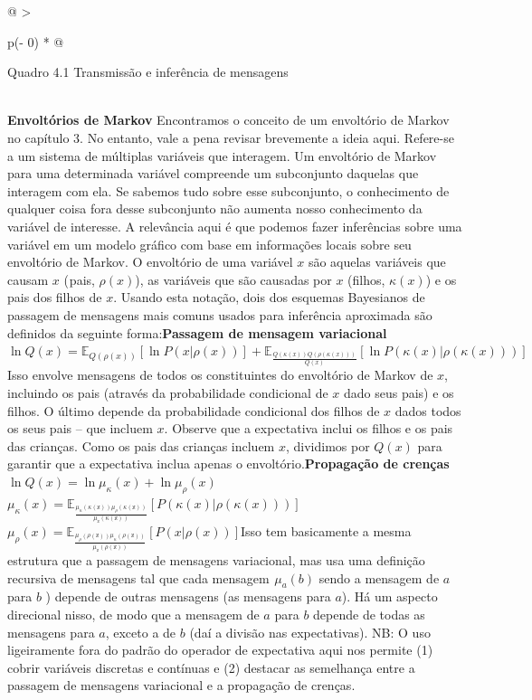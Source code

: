 \documentclass[
  12pt,
]{book}
\begin{document}
\begin{longtable}[]{@{}
  >{\raggedright\arraybackslash}p{(\columnwidth - 0\tabcolsep) * }@{}}
\toprule
\begin{minipage}[b]{\linewidth}\raggedright
Quadro 4.1 Transmissão e inferência de mensagens
\end{minipage} \\
\midrule
\endhead
\textbf{Envoltórios de Markov} Encontramos o conceito de um envoltório de Markov no capítulo 3. No entanto, vale a pena revisar brevemente a ideia aqui. Refere-se a um sistema de múltiplas variáveis que interagem. Um envoltório de Markov para uma determinada variável compreende um subconjunto daquelas que interagem com ela. Se sabemos tudo sobre esse subconjunto, o conhecimento de qualquer coisa fora desse subconjunto não aumenta nosso conhecimento da variável de interesse. A relevância aqui é que podemos fazer inferências sobre uma variável em um modelo gráfico com base em informações locais sobre seu envoltório de Markov. O envoltório de uma variável \(x\) são aquelas variáveis que causam \(x\) ( pais, \(ρ(x)\)), as variáveis que são causadas por \(x\) (filhos, \(κ (x)\)) e os pais dos filhos de \(x\). Usando esta notação, dois dos esquemas Bayesianos de passagem de mensagens mais comuns usados para inferência aproximada são definidos da seguinte forma:\textbf{Passagem de mensagem variacional}\( \ln Q(x)=\mathbb{E}_{Q(\rho(x))}[\ln P(x|\rho(x))]+\mathbb{E}_{\frac {Q(\kappa (x))Q(\rho(\kappa (x)))}{Q(x)}}[\ln P( \kappa (x) | \rho(\kappa (x)))]\)Isso envolve mensagens de todos os constituintes do envoltório de Markov de \(x\), incluindo os pais (através da probabilidade condicional de \(x\) dado seus pais) e os filhos. O último depende da probabilidade condicional dos filhos de \(x\) dados todos os seus pais -- que incluem \(x\). Observe que a expectativa inclui os filhos e os pais das crianças. Como os pais das crianças incluem \(x\), dividimos por \(Q(x)\) para garantir que a expectativa inclua apenas o envoltório.\textbf{Propagação de crenças}\(\ln Q(x) = \ln \mu_\kappa(x) + \ln \mu_\rho(x) \) \(\mu_\kappa(x)=\mathbb{E_{\frac{\mu_\kappa(\kappa(x))\mu_\rho(\kappa(x))}{\mu_x(\kappa(x))}}}[P( \kappa(x) | \rho(\kappa(x)) )]\)\(\mu_\rho(x)=\mathbb{E_{\frac{\mu_\rho(\rho(x))\mu_\kappa(\rho(x))}{\mu_x(\rho(x))}}}[P( x | \rho(x) )]\)Isso tem basicamente a mesma estrutura que a passagem de mensagens variacional, mas usa uma definição recursiva de mensagens tal que cada mensagem  \(μ_a(b)\) sendo a mensagem de \(a\) para \(b\) ) depende de outras mensagens (as mensagens para \(a\)). Há um aspecto direcional nisso, de modo que a mensagem de \(a\) para \(b\) depende de todas as mensagens para \(a\), exceto a de \(b\) (daí a divisão nas expectativas). NB: O uso ligeiramente fora do padrão do operador de expectativa aqui nos permite (1) cobrir variáveis discretas e contínuas e (2) destacar as semelhança entre a passagem de mensagens variacional e a propagação de crenças. \\
\bottomrule
\end{longtable}
\end{document}
